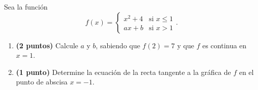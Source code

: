 
Sea la función
\[
f(x)=\begin{cases}
x^2+4&\text{si }x\leq1\\[0.4em]
ax+b&\text{si }x>1
\end{cases}.
\]
\begin{enumerate}[label=\alph*)]
\item \textbf{(2 puntos)} Calcule $a$ y $b$, sabiendo que $f(2)=7$ y que $f$ es continua en $x=1$.
\item \textbf{(1 punto)} Determine la ecuación de la recta tangente a la gráfica de $f$ en el punto de abscisa $x=-1$.
\end{enumerate}
